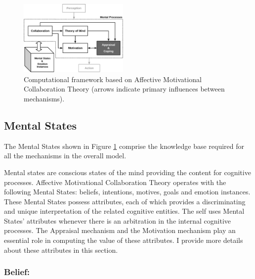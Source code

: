 \documentclass[letterpaper]{article}
\begin{document}
\begin{figure}[tbh]
  \centering
  \includegraphics[width=0.474\textwidth]{figure/theory-general-croped.pdf}
  \caption{Computational framework based on Affective Motivational Collaboration
  Theory (arrows indicate primary influences between mechanisms).}
  \label{fig:cpm}
\end{figure}

\subsection{Mental States}
\label{sec:mental-states}

The Mental States shown in Figure \ref{fig:cpm} comprise the knowledge
base required for all the mechanisms in the overall model.

Mental states are conscious states of the mind providing the content for
cognitive processes. Affective Motivational Collaboration Theory operates with
the following Mental States: beliefs, intentions, motives, goals and emotion
instances. These Mental States possess attributes, each of which provides a
discriminating and unique interpretation of the related cognitive entities. The
self uses Mental States' attributes whenever there is an arbitration in the
internal cognitive processes. The Appraisal mechanism and the Motivation
mechanism play an essential role in computing the value of these attributes. I
provide more details about these attributes in this section.

\subsubsection{Belief:}
\end{document}
